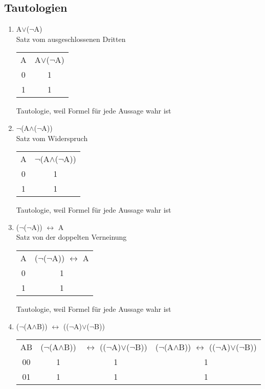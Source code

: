 \subsection{Tautologien}
\begin{enumerate}
    \item A$\vee$($\neg$A) \\ Satz vom ausgeschlossenen Dritten\\
        {\tiny
        \begin{tabular}{cc}
            A & A$\vee$($\neg$A)\\
            0 & 1\\
            1 & 1\\
        \end{tabular}
        Tautologie, weil Formel für jede Aussage wahr ist}
    \item $\neg$(A$\wedge$($\neg$A)) \\ Satz vom Widerspruch\\
        {\tiny
        \begin{tabular}{cc}
            A & $\neg$(A$\wedge$($\neg$A))\\
            0 & 1 \\
            1 & 1 \\
        \end{tabular}
        Tautologie, weil Formel für jede Aussage wahr ist}
    \item ($\neg$($\neg$A)) $\leftrightarrow$ A \\ Satz von der doppelten Verneinung\\
        {\tiny
        \begin{tabular}{cc}
            A & ($\neg$($\neg$A)) $\leftrightarrow$ A\\
            0 & 1 \\
            1 & 1 \\
        \end{tabular}
        Tautologie, weil Formel für jede Aussage wahr ist}
    \item ($\neg$(A$\wedge$B)) $\leftrightarrow$ (($\neg$A)$\vee$($\neg$B)) \\
        {\tiny
        \begin{tabular}{cccc}
            AB & ($\neg$(A$\wedge$B)) & $\leftrightarrow$ (($\neg$A)$\vee$($\neg$B))
            & ($\neg$(A$\wedge$B)) $\leftrightarrow$ (($\neg$A)$\vee$($\neg$B))\\
            00 & 1 & 1 & 1 \\
            01 & 1 & 1 & 1 \\

\end{tabular}}
\end{enumerate}
